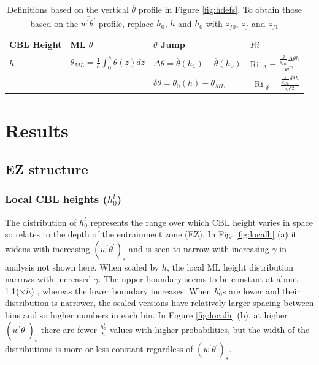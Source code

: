 \begin{table}[htbp]
\caption[Height definitions]{Definitions based on the vertical $\overline{\theta}$ profile in Figure \ref{fig:hdefs}. To obtain those based on the $\overline{w^{'}\theta^{'}}$ profile, replace $h_{0}$, $h$ and $h_{0}$ with $z_{f0}$, $z_{f}$ and $z_{f1}$}


    \begin{tabular}{p{} p{} p{3cm} p{2.5cm}}
    
      CBL Height & ML $\overline{\theta}$ & $\theta$ Jump &$     Ri $\\ \hline 
       $h$ & $\overline{\theta}_{ML} = \frac{1}{h}\int^{h}_{0}\overline{\theta}(z)dz$ & $\Delta \theta=\overline{\theta}(h_{1})-\overline{\theta}(h_{0})$ &      Ri $_{\Delta}=\frac{\frac{g}{\overline{\theta}_{ML}}\Delta \theta h}{w^{*2}}$  \\ [.3cm] 
        
       & &$\delta \theta = \overline{\theta}_{0}(h)- \overline{\theta}_{ML}$ & \    Ri $_{\delta}=\frac{\frac{g}{\overline{\theta}_{ML}} \delta \theta h}{w^{*2}}$ \\ \hline
      \end{tabular}

\label{tab:reldefs}   
    
\end{table}

\section{Results}
\subsection{EZ structure}

\subsubsection{Local CBL heights ($h_{0}^{l}$)}
\label{subsubsec:loccblh}

The distribution of $h_{0}^{l}$ represents the range over which CBL height varies in space so relates to the depth of the entrainment zone (EZ).  In Fig. \ref{fig:localh} (a) it widens with increasing $(\overline{w^{'}\theta^{'}})_{s}$ and is seen to narrow with increasing $\gamma$ in analysis not shown here.  When scaled by $h$, the local ML height distribution narrows with increased $\gamma$.  The upper boundary seems to be constant at about 1.1($\times h$) , whereas the lower boundary increases.  When $h_{0}^{l}$s are lower and their distribution is narrower, the scaled versions have relatively larger spacing between bins and so higher numbers in each bin. In Figure \ref{fig:localh} (b), at higher $(\overline{w^{'}\theta^{'}})_{s}$ there are fewer $\frac{h_{0}^{l}}{h}$ values with higher probabilities, but the width of the distributions is more or less constant regardless of $(w^{'}\theta^{'})_{s}$.\\


